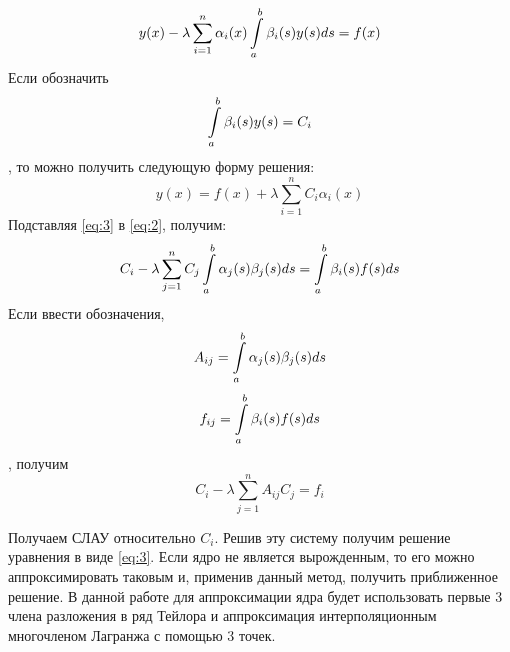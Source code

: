 \documentclass[14pt, a4paper]{extarticle}
\begin{document}
		\[ y(x) - \lambda \sum_{i=1}^{n} \alpha_i(x) \int\displaylimits_{a}^{b} \beta_i(s)y(s)ds = f(x) \]
		Если обозначить 
		\[ \int\displaylimits_{a}^{b} \beta_i(s)y(s) = C_i \]
		, то можно получить следующую форму решения:
		\begin{equation}
			y(x) = f(x) + \lambda \sum_{i=1}^{n} C_i \alpha_i(x)
			\label{eq:3}
		\end{equation}
		Подставляя \ref{eq:3} в \ref{eq:2}, получим:
		\[ C_i - \lambda \sum_{j=1}^{n} C_j\int\displaylimits_{a}^{b} \alpha_j(s)\beta_j(s)ds = \int\displaylimits_{a}^{b} \beta_i(s)f(s)ds \]
		\pagebreak
		Если ввести обозначения,
		\[ A_{ij} = \int\displaylimits_{a}^{b} \alpha_j(s)\beta_j(s)ds \]
		\[ f_{ij} = \int\displaylimits_{a}^{b} \beta_i(s)f(s)ds \]
		, получим
		\[ C_i - \lambda \sum_{j=1}^{n} A_{ij}C_j = f_i \]
		
		Получаем СЛАУ относительно $C_i$. Решив эту систему получим решение уравнения в виде \ref{eq:3}.
		Если ядро не является вырожденным, то его можно аппроксимировать таковым и, применив данный метод, получить приближенное решение. В данной работе для аппроксимации ядра будет использовать первые 3 члена разложения в ряд Тейлора и аппроксимация интерполяционным многочленом Лагранжа с помощью 3 точек.
			
\end{document}
